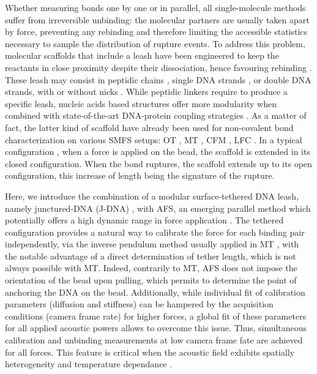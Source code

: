 \documentclass{biophys-new}
\begin{document}
Whether measuring bonds one by one or in parallel, all single-molecule methods suffer from irreversible unbinding: the molecular partners are usually taken apart by force, preventing any rebinding and therefore limiting the accessible statistics necessary to sample the distribution of rupture events. To address this problem, molecular scaffolds that include a leash have been engineered to keep the reactants in close proximity despite their dissociation, hence favouring rebinding \cite{kim2010, halvorsen2010, gosse2019}. These leash may consist in peptidic chains \cite{kim2010, gao2012, rognoni2012, wang2019, bauer2022}, single DNA strands \cite{mickolajczyk2022, shrestha2021, kilchherr2016}, or double DNA strands, with \cite{yang2016, halvorsen2011, penth2021} or without nicks \cite{li2019, kostrz2019, ma2019}. While peptidic linkers require to produce a specific leash, nucleic acids based structures offer more modularity when combined with state-of-the-art DNA-protein coupling strategies \cite{gosse2019, kostrz2019, maciuba2021, mukhortava2016, synakewicz2019, vandersleen2021, koussa2014, madsen2019}. As a matter of fact, the latter kind of scaffold have already been used for non-covalent bond characterization on various SMFS setups: OT \cite{mickolajczyk2022, kilchherr2016, shrestha2021,yang2016,halvorsen2010}, MT \cite{kostrz2019, shrestha2021, li2019,ma2019}, CFM \cite{yang2016}, LFC \cite{penth2021}. In a typical configuration \cite{kostrz2019}, when a force is applied on the bead, the scaffold is extended in its closed configuration. When the bond ruptures, the scaffold extends up to its open configuration, this increase of length being the signature of the rupture.

Here, we introduce the combination of a modular surface-tethered DNA leash, namely junctured-DNA (J-DNA) \cite{kostrz2019}, with AFS, an emerging parallel method which potentially offers a high dynamic range in force application \cite{sitters2015, kamsma2016}. The tethered configuration provides a natural way to calibrate the force for each binding pair independently, via the inverse pendulum method usually applied in MT \cite{strick1996,gosse2002}, with the notable advantage of a direct determination of tether length, which is not always possible with MT. Indeed, contrarily to MT, AFS does not impose the orientation of the bead upon pulling, which permits to determine the point of anchoring the DNA on the bead. Additionally, while individual fit of calibration parameters (diffusion and stiffness) can be hampered by the acquisition conditions (camera frame rate) for higher forces, a global fit of these parameters for all applied acoustic powers allows to overcome this issue. Thus, simultaneous calibration and unbinding measurements at low camera frame fate are achieved for all forces. This feature is critical when the acoustic field exhibits spatially heterogeneity and temperature dependance \cite{kamsma2016, nguyen2021}. %
\end{document}
